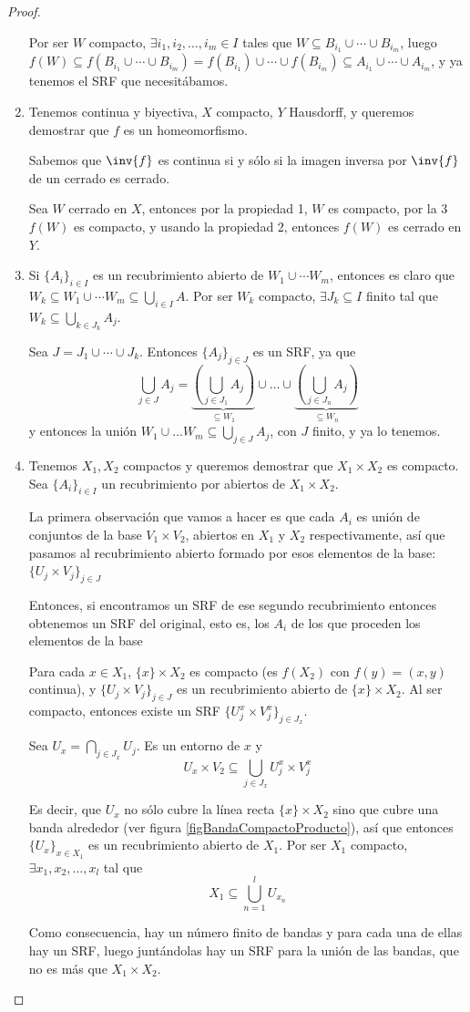 \documentclass{apuntes}
\begin{document}
\begin{proof}
\begin{enumerate}
	Por ser $W$ compacto, $∃i_1, i_2, \dotsc, i_m ∈ I$ tales que $W⊆B_{i_1} ∪ \dotsb ∪ B_{i_m}$, luego $f(W) ⊆ f(B_{i_1} ∪ \dotsb ∪ B_{i_m}) = f(B_{i_1}) ∪ \dotsb ∪ f(B_{i_m}) ⊆ A_{i_1} ∪ \dotsb ∪ A_{i_m}$, y ya tenemos el SRF que necesitábamos.
	\item Tenemos \stdf continua y biyectiva, $X$ compacto, $Y$ Hausdorff, y queremos demostrar que $f$ es un homeomorfismo.

	Sabemos que $\inv{f}$ es continua si y sólo si la imagen inversa por $\inv{f}$ de un cerrado es cerrado.

	Sea $W$ cerrado en $X$, entonces por la propiedad 1, $W$ es compacto, por la 3 $f(W)$ es compacto, y usando la propiedad 2, entonces $f(W)$ es cerrado en $Y$.
	\item Si $\{A_i\}_{i∈I}$ es un recubrimiento abierto de $W_1 ∪ \dotsb W_m$, entonces es claro que $W_k ⊆ W_1 ∪ \dotsb W_m ⊆ \bigcup_{i∈I} A$. Por ser $W_k$ compacto, $∃J_k ⊆ I$ finito tal que $W_k ⊆ \bigcup_{k∈J_k} A_j$.

	Sea $J = J_1 ∪ \dotsb ∪ J_k$. Entonces $\{A_j\}_{j∈J}$ es un SRF, ya que \[ \bigcup_{j∈J} A_j = \underbrace{\left(\bigcup_{j∈J_1} A_j\right)}_{⊆W_1} ∪ \dotsc ∪ \underbrace{\left(\bigcup_{j∈J_n} A_j\right)}_{⊆W_n} \] y entonces la unión $W_1 ∪ \dotsc W_m ⊆ \bigcup_{j∈J} A_j$, con $J$ finito, y ya lo tenemos.
	\item Tenemos $X_1, X_2$ compactos y queremos demostrar que $X_1×X_2$ es compacto. Sea $\{A_i\}_{i∈I}$ un recubrimiento por abiertos de $X_1×X_2$.

	La primera observación que vamos a hacer es que cada $A_i$ es unión de conjuntos de la base $V_1×V_2$, abiertos en $X_1$ y $X_2$ respectivamente, así que pasamos al recubrimiento abierto formado por esos elementos de la base: $\{U_j×V_j\}_{j∈J}$

	Entonces, si encontramos un SRF de ese segundo recubrimiento entonces obtenemos un SRF del original, esto es, los $A_i$ de los que proceden los elementos de la base

	Para cada $x∈X_1$, $\{x\}×X_2$ es compacto (es $f(X_2)$ con $f(y) = (x,y)$ continua), y $\{U_j×V_j\}_{j∈J}$ es un recubrimiento abierto de $\{x\}×X_2$. Al ser compacto, entonces existe un SRF $\{U_j^x×V_j^x\}_{j∈J_x}$.

	Sea $U_x = \bigcap_{j∈J_x} U_j$. Es un entorno de $x$ y \[ U_x×V_2 ⊆ \bigcup_{j∈J_x}U^x_j × V_j^x \]

	Es decir, que $U_x$ no sólo cubre la línea recta $\{x\}×X_2$ sino que cubre una banda alrededor (ver figura \ref{figBandaCompactoProducto}), así que entonces $\{U_x\}_{x∈X_1}$ es un recubrimiento abierto de $X_1$. Por ser $X_1$ compacto, $∃x_1, x_2,\dotsc, x_l$ tal que \[ X_1⊆ \bigcup_{n=1}^l U_{x_n}\]

	Como consecuencia, hay un número finito de bandas y para cada una de ellas hay un SRF, luego juntándolas hay un SRF para la unión de las bandas, que no es más que $X_1×X_2$.
\end{enumerate}
\end{proof}
\end{document}
